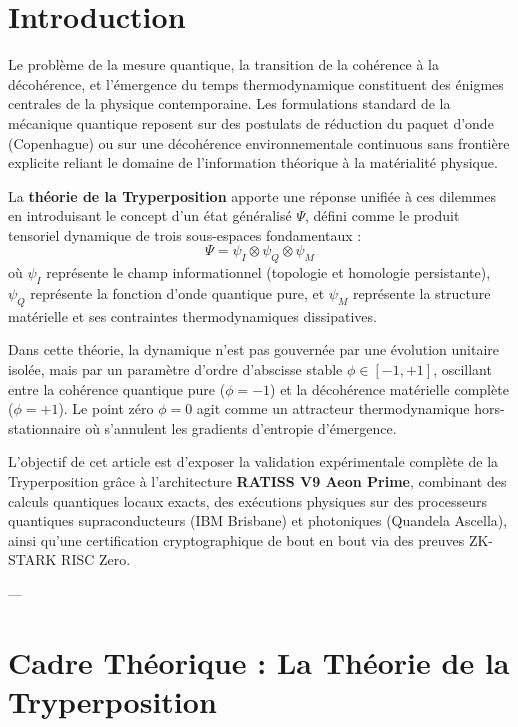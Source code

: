 \documentclass[12pt,a4paper]{article}
\begin{document}
\newpage
\tableofcontents
\newpage

\section{Introduction}

Le problème de la mesure quantique, la transition de la cohérence à la décohérence, et l'émergence du temps thermodynamique constituent des énigmes centrales de la physique contemporaine. Les formulations standard de la mécanique quantique reposent sur des postulats de réduction du paquet d'onde (Copenhague) ou sur une décohérence environnementale continuous sans frontière explicite reliant le domaine de l'information théorique à la matérialité physique.

La \textbf{théorie de la Tryperposition} apporte une réponse unifiée à ces dilemmes en introduisant le concept d'un état généralisé $\Psi$, défini comme le produit tensoriel dynamique de trois sous-espaces fondamentaux :
\begin{equation}
\Psi = \psi_I \otimes \psi_Q \otimes \psi_M
\end{equation}
où $\psi_I$ représente le champ informationnel (topologie et homologie persistante), $\psi_Q$ représente la fonction d'onde quantique pure, et $\psi_M$ représente la structure matérielle et ses contraintes thermodynamiques dissipatives.

Dans cette théorie, la dynamique n'est pas gouvernée par une évolution unitaire isolée, mais par un paramètre d'ordre d'abscisse stable $\phi \in [-1, +1]$, oscillant entre la cohérence quantique pure ($\phi = -1$) et la décohérence matérielle complète ($\phi = +1$). Le point zéro $\phi = 0$ agit comme un attracteur thermodynamique hors-stationnaire où s'annulent les gradients d'entropie d'émergence.

L'objectif de cet article est d'exposer la validation expérimentale complète de la Tryperposition grâce à l'architecture \textbf{RATISS V9 Aeon Prime}, combinant des calculs quantiques locaux exacts, des exécutions physiques sur des processeurs quantiques supraconducteurs (IBM Brisbane) et photoniques (Quandela Ascella), ainsi qu'une certification cryptographique de bout en bout via des preuves ZK-STARK RISC Zero.

---

\section{Cadre Théorique : La Théorie de la Tryperposition}
\end{document}
